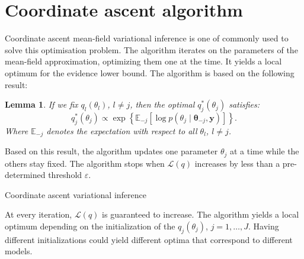 \documentclass[a4paper, 11pt]{report}
\numberwithin{equation}{chapter}
\newtheorem{lemma}{Lemma}[chapter]
\begin{document}
\section{Coordinate ascent algorithm}
Coordinate ascent mean-field variational inference  is one of commonly used to solve this optimisation problem. The algorithm iterates on the parameters of the mean-field approximation, optimizing them one at the time. It yields a local optimum for the evidence lower bound. The algorithm is based on the following result:
\begin{lemma}

If we fix $q_l(\theta_l)$, $l\neq j$, then the optimal $q^*_j(\theta_j)$ satisfies:
\begin{equation*}
q^*_j(\theta_j) \propto \exp\left\lbrace\mathbb{E}_{-j}\left[\log p(\theta_j \mid \boldsymbol{\theta}_{-j}, \boldsymbol{y})\right]\right\rbrace.
\end{equation*}
Where $\mathbb{E}_{-j}$ denotes the expectation with respect to all $\theta_l$, $l \neq j$.
\end{lemma}

Based on this result, the algorithm updates one parameter $\theta_j$ at a time while the others stay fixed. The algorithm stops when $\mathcal{L}(q)$ increases by less than a pre-determined threshold $\varepsilon$.

\begin{algorithm}
\BlankLine
{}
\BlankLine
{}
\BlankLine
{}
\caption{\label{alg:CAVI}Coordinate ascent variational inference}
\end{algorithm}
At every iteration, $\mathcal{L}(q)$ is guaranteed to increase. The algorithm yields a local optimum depending on the initialization of the $q_j(\theta_j)$, $j=1,\ldots,J$. Having different initializations could yield different optima that correspond to different models.
\end{document}
